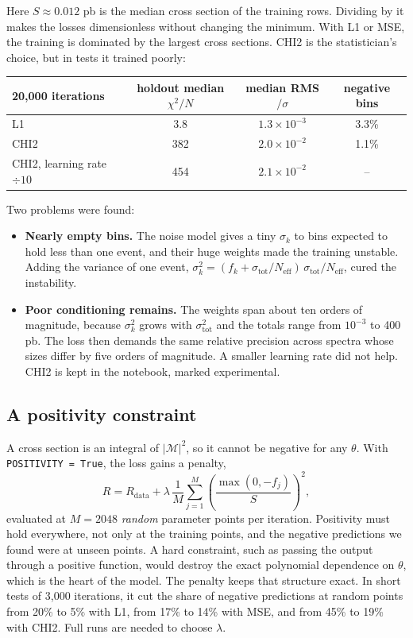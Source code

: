 \documentclass[11pt]{article}
\newcommand{\code}[1]{\texttt{#1}}
\newcommand{\neff}{N_\text{eff}}
\newcommand{\stot}{\sigma_\text{tot}}
\begin{document}
Here $S \approx 0.012$ pb is the median cross section of the training rows. Dividing
by it makes the losses dimensionless without changing the minimum. With L1 or MSE,
the training is dominated by the largest cross sections. CHI2 is the statistician's
choice, but in tests it trained poorly:

\begin{center}
\small
\begin{tabular}{lccc}
\toprule
20,000 iterations & holdout median $\chi^2/N$ & median RMS$/\sigma$ & negative bins\\
\midrule
L1 & 3.8 & $1.3 \times 10^{-3}$ & 3.3\%\\
CHI2 & 382 & $2.0 \times 10^{-2}$ & 1.1\%\\
CHI2, learning rate $\div 10$ & 454 & $2.1 \times 10^{-2}$ & --\\
\bottomrule
\end{tabular}
\end{center}

Two problems were found:
\begin{itemize}
  \item \textbf{Nearly empty bins.} The noise model gives a tiny $\sigma_k$ to bins
  expected to hold less than one event, and their huge weights made the training
  unstable. Adding the variance of one event,
  $\sigma_k^2 = (f_k + \stot/\neff)\,\stot/\neff$, cured the instability.
  \item \textbf{Poor conditioning remains.} The weights span about ten orders of
  magnitude, because $\sigma_k^2$ grows with $\stot^2$ and the totals range from
  $10^{-3}$ to 400 pb. The loss then demands the same relative precision across
  spectra whose sizes differ by five orders of magnitude. A smaller learning rate did
  not help. CHI2 is kept in the notebook, marked experimental.
\end{itemize}

\subsection{A positivity constraint}

A cross section is an integral of $|\mathcal{M}|^2$, so it cannot be negative for any
$\theta$. With \code{POSITIVITY = True}, the loss gains a penalty,
\[
  R = R_\text{data} + \lambda\,\frac{1}{M}\sum_{j=1}^{M}\left(\frac{\max(0, -f_j)}{S}\right)^2 ,
\]
evaluated at $M = 2048$ \emph{random} parameter points per iteration. Positivity must
hold everywhere, not only at the training points, and the negative predictions we
found were at unseen points. A hard constraint, such as passing the output through a
positive function, would destroy the exact polynomial dependence on $\theta$, which is
the heart of the model. The penalty keeps that structure exact. In short tests of
3,000 iterations, it cut the share of negative predictions at random points from 20\%
to 5\% with L1, from 17\% to 14\% with MSE, and from 45\% to 19\% with CHI2. Full runs
are needed to choose $\lambda$.
\end{document}
